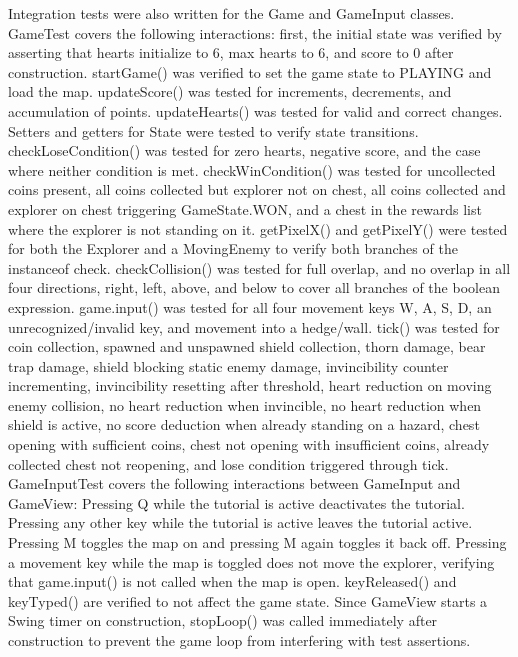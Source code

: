 \documentclass[12pt,letterpaper]{article}
\begin{document}
Integration tests were also written for the Game and GameInput classes. GameTest covers the following interactions: first, the initial state was verified by asserting that hearts initialize to 6, max hearts to 6, and score to 0 after construction. startGame() was verified to set the game state to PLAYING and load the map. updateScore() was tested for increments, decrements, and accumulation of points. updateHearts() was tested for valid and correct changes. Setters and getters for State were tested to verify state transitions. checkLoseCondition() was tested for zero hearts, negative score, and the case where neither condition is met. checkWinCondition() was tested for uncollected coins present, all coins collected but explorer not on chest, all coins collected and explorer on chest triggering GameState.WON, and a chest in the rewards list where the explorer is not standing on it. getPixelX() and getPixelY() were tested for both the Explorer and a MovingEnemy to verify both branches of the instanceof check. checkCollision() was tested for full overlap, and no overlap in all four directions, right, left, above, and below to cover all branches of the boolean expression. game.input() was tested for all four movement keys W, A, S, D, an unrecognized/invalid key, and movement into a hedge/wall. tick() was tested for coin collection, spawned and unspawned shield collection, thorn damage, bear trap damage, shield blocking static enemy damage, invincibility counter incrementing, invincibility resetting after threshold, heart reduction on moving enemy collision, no heart reduction when invincible, no heart reduction when shield is active, no score deduction when already standing on a hazard, chest opening with sufficient coins, chest not opening with insufficient coins, already collected chest not reopening, and lose condition triggered through tick. GameInputTest covers the following interactions between GameInput and GameView: Pressing Q while the tutorial is active deactivates the tutorial. Pressing any other key while the tutorial is active leaves the tutorial active. Pressing M toggles the map on and pressing M again toggles it back off. Pressing a movement key while the map is toggled does not move the explorer, verifying that game.input() is not called when the map is open. keyReleased() and keyTyped() are verified to not affect the game state. Since GameView starts a Swing timer on construction, stopLoop() was called immediately after construction to prevent the game loop from interfering with test assertions.
\end{document}
